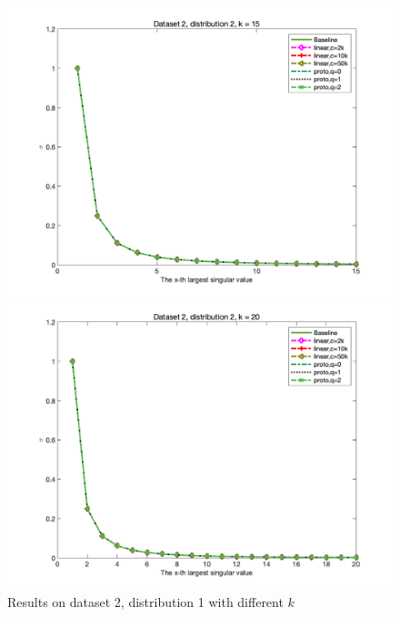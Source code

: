 \documentclass{article}
\begin{document}
\begin{figure}[p]
\begin{minipage}{0.54\linewidth}
		\includegraphics[width=1\linewidth]{./fig/dataset2_k15_t2.png}
		\caption{$k=15$}
	\end{minipage}
	\begin{minipage}{0.54\linewidth}
		\centering
		\includegraphics[width=1\linewidth]{./fig/dataset2_k20_t2.png}
		\caption{$k=20$}
	\end{minipage}
	\caption*{Results on dataset 2, distribution 1 with different $k$}
\end{figure} 








\end{document}

